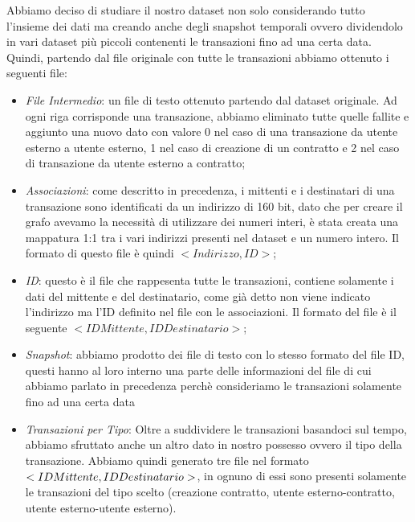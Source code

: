 \documentclass[12pt]{report}
\begin{document}
Abbiamo deciso di studiare il nostro dataset non solo considerando tutto l'insieme dei dati ma creando anche degli snapshot temporali ovvero dividendolo in vari dataset più piccoli contenenti le transazioni fino ad una certa data.
Quindi, partendo dal file originale con tutte le transazioni abbiamo ottenuto i seguenti file:

\begin{itemize}
    \item \textit{File Intermedio}: un file di testo ottenuto partendo dal dataset originale. Ad ogni riga corrisponde una transazione, abbiamo eliminato tutte quelle fallite e aggiunto una nuovo dato con valore 0 nel caso di una transazione da utente esterno a utente esterno, 1 nel caso di creazione di un contratto e 2 nel caso di transazione da utente esterno a contratto;
    \item \textit{Associazioni}: come descritto in precedenza, i mittenti e i destinatari di una transazione sono identificati da un indirizzo di 160 bit, dato che per creare il grafo avevamo la necessità di utilizzare dei numeri interi, è stata creata una mappatura 1:1 tra i vari indirizzi presenti nel dataset e un numero intero.
    Il formato di questo file è quindi $<Indirizzo, ID>$;
    \item \textit{ID}: questo è il file che rappesenta tutte le transazioni, contiene solamente i dati del mittente e del destinatario, come già detto non viene indicato l'indirizzo ma l'ID definito nel file con le associazioni. Il formato del file è il seguente $<IDMittente,  IDDestinatario>$;
    \item \textit{Snapshot}: abbiamo prodotto dei file di testo con lo stesso formato del file ID, questi hanno al loro interno una parte delle informazioni del file di cui abbiamo parlato in precedenza perchè consideriamo le transazioni solamente fino ad una certa data
    \item \textit{Transazioni per Tipo}: Oltre a suddividere le transazioni basandoci sul tempo, abbiamo sfruttato anche un altro dato in nostro possesso ovvero il tipo della transazione. Abbiamo quindi generato tre file nel formato $<IDMittente,\newline
    IDDestinatario>$, in ognuno di essi sono presenti solamente le transazioni del tipo scelto (creazione contratto, utente esterno-contratto, utente esterno-utente esterno).
\end{itemize}
\end{document}
